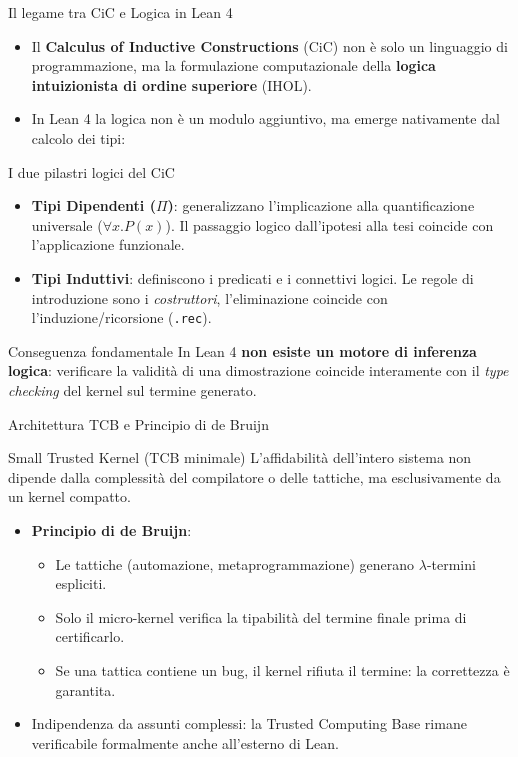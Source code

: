\begin{frame}{Il legame tra CiC e Logica in Lean 4}
    \begin{itemize}
        \item Il \textbf{Calculus of Inductive Constructions} (CiC) non è solo un linguaggio di programmazione, ma la formulazione computazionale della \textbf{logica intuizionista di ordine superiore} (IHOL).
        \item In Lean 4 la logica non è un modulo aggiuntivo, ma emerge nativamente dal calcolo dei tipi:
    \end{itemize}

    \begin{block}{I due pilastri logici del CiC}
        \begin{itemize}
            \item \textbf{Tipi Dipendenti ($\Pi$)}: generalizzano l'implicazione alla quantificazione universale ($\forall x. P(x)$). Il passaggio logico dall'ipotesi alla tesi coincide con l'applicazione funzionale.
            \item \textbf{Tipi Induttivi}: definiscono i predicati e i connettivi logici. Le regole di introduzione sono i \emph{costruttori}, l'eliminazione coincide con l'induzione/ricorsione (\texttt{.rec}).
        \end{itemize}
    \end{block}

    \begin{block}{Conseguenza fondamentale}
        In Lean 4 \textbf{non esiste un motore di inferenza logica}: verificare la validità di una dimostrazione coincide interamente con il \emph{type checking} del kernel sul termine generato.
    \end{block}
\end{frame}

\begin{frame}{Architettura TCB e Principio di de Bruijn}
    \begin{block}{Small Trusted Kernel (TCB minimale)}
        L'affidabilità dell'intero sistema non dipende dalla complessità del compilatore o delle tattiche, ma esclusivamente da un kernel compatto.
    \end{block}

    \vskip 0.20cm
    \begin{itemize}
        \item \textbf{Principio di de Bruijn}:
        \begin{itemize}
            \item Le tattiche (automazione, metaprogrammazione) generano $\lambda$-termini espliciti.
            \item Solo il micro-kernel verifica la tipabilità del termine finale prima di certificarlo.
            \item Se una tattica contiene un bug, il kernel rifiuta il termine: la correttezza è garantita.
        \end{itemize}
        \item Indipendenza da assunti complessi: la Trusted Computing Base rimane verificabile formalmente anche 
        all'esterno di Lean.
    \end{itemize}
\end{frame}